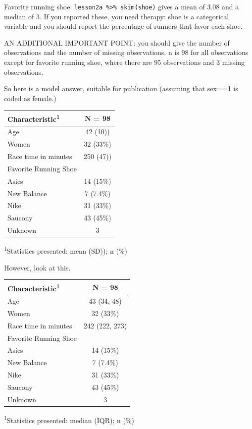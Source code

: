 \documentclass[]{book}
\begin{document}
Favorite running shoe: \texttt{lesson2a\ \%\textgreater{}\%\ skim(shoe)}
gives a mean of 3.08 and a median of 3. If you reported these, you need
therapy: shoe is a categorical variable and you should report the
percentage of runners that favor each shoe.

AN ADDITIONAL IMPORTANT POINT: you should give the number of
observations and the number of missing observations. n is 98 for all
observations except for favorite running shoe, where there are 95
observations and 3 missing observations.

So here is a model answer, suitable for publication (assuming that
sex==1 is coded as female.)

\captionsetup[table]{labelformat=empty,skip=1pt}
\begin{longtable}{lc}
\toprule
\textbf{Characteristic}\textsuperscript{1} & \textbf{N = 98} \\ 
\midrule
Age & 42 (10)) \\ 
Women & 32 (33\%) \\ 
Race time in minutes & 250 (47)) \\ 
Favorite Running Shoe &  \\ 
Asics & 14 (15\%) \\ 
New Balance & 7 (7.4\%) \\ 
Nike & 31 (33\%) \\ 
Saucony & 43 (45\%) \\ 
Unknown & 3 \\ 
\bottomrule
\end{longtable}
\vspace{-5mm}
\begin{minipage}{\linewidth}
\textsuperscript{1}Statistics presented: mean (SD)); n (\%) \\ 
\end{minipage}

However, look at this.

\captionsetup[table]{labelformat=empty,skip=1pt}
\begin{longtable}{lc}
\toprule
\textbf{Characteristic}\textsuperscript{1} & \textbf{N = 98} \\ 
\midrule
Age & 43 (34, 48) \\ 
Women & 32 (33\%) \\ 
Race time in minutes & 242 (222, 273) \\ 
Favorite Running Shoe &  \\ 
Asics & 14 (15\%) \\ 
New Balance & 7 (7.4\%) \\ 
Nike & 31 (33\%) \\ 
Saucony & 43 (45\%) \\ 
Unknown & 3 \\ 
\bottomrule
\end{longtable}
\vspace{-5mm}
\begin{minipage}{\linewidth}
\textsuperscript{1}Statistics presented: median (IQR); n (\%) \\ 
\end{minipage}
\end{document}

